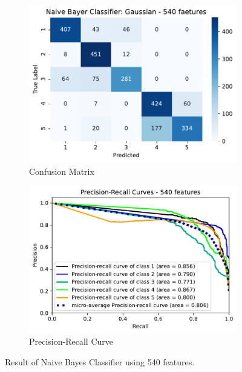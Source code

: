 \documentclass[10pt, a4paper, twocolumn]{article}
\begin{document}
\begin{figure}

    \centering
    \begin{subfigure}[t]{0.45\columnwidth}
    \includegraphics[width=\linewidth]{immagini Lia/confusion_matrix_540_w6.pdf}
    \caption{Confusion Matrix}
    \label{fig:conmat540}
\end{subfigure}
  \hfill %
\begin{subfigure}[t]{0.49\columnwidth}
    \centering
    \includegraphics[width=\linewidth]{immagini Lia/precision_recall_540_w6.pdf}
    \caption{Precision-Recall Curve}
    \label{fig:prerec540}
    \end{subfigure}
    
    \caption{Result of Naive Bayes Classifier using 540 features.}\label{fig:graph540}
    
\end{figure}
\end{document}
